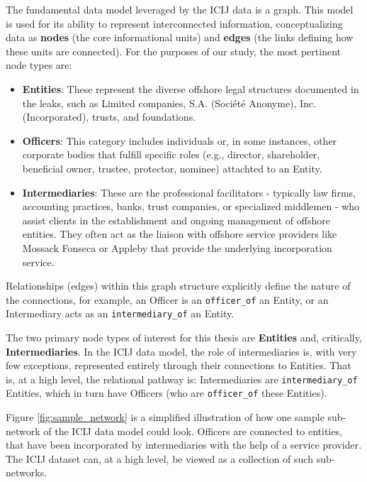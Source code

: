 The fundamental data model leveraged by the ICIJ data is a graph. This model is used for its ability to represent interconnected information, conceptualizing data as \textbf{nodes} (the core informational units) and \textbf{edges} (the links defining how these units are connected). For the purposes of our study, the most pertinent node types are:

\begin{itemize}
    \item \textbf{Entities}: These represent the diverse offshore legal structures documented in the leaks, such as Limited companies, S.A. (Société Anonyme), Inc. (Incorporated), trusts, and foundations.
    \item \textbf{Officers}: This category includes individuals or, in some instances, other corporate bodies that fulfill specific roles (e.g., director, shareholder, beneficial owner, trustee, protector, nominee) attachted to an Entity.
    \item \textbf{Intermediaries}: These are the professional facilitators - typically law firms, accounting practices, banks, trust companies, or specialized middlemen - who assist clients in the establishment and ongoing management of offshore entities. They often act as the liaison with offshore service providers like Mossack Fonseca or Appleby that provide the underlying incorporation service.
\end{itemize}

Relationships (edges) within this graph structure explicitly define the nature of the connections, for example, an Officer is an \texttt{officer\_of} an Entity, or an Intermediary acts as an \texttt{intermediary\_of} an Entity.

The two primary node types of interest for this thesis are \textbf{Entities} and, critically, \textbf{Intermediaries}. In the ICIJ data model, the role of intermediaries is, with very few exceptions, represented entirely through their connections to Entities. That is, at a high level, the relational pathway is: Intermediaries are \texttt{intermediary\_of} Entities, which in turn have Officers (who are \texttt{officer\_of} these Entities).

Figure \ref{fig:sample_network} is a simplified illustration of how one sample sub-network of the ICIJ data model could look. Officers are connected to entities, that have been incorporated by intermediaries with the help of a service provider. The ICIJ dataset can, at a high level, be viewed as a collection of such sub-networks. 

